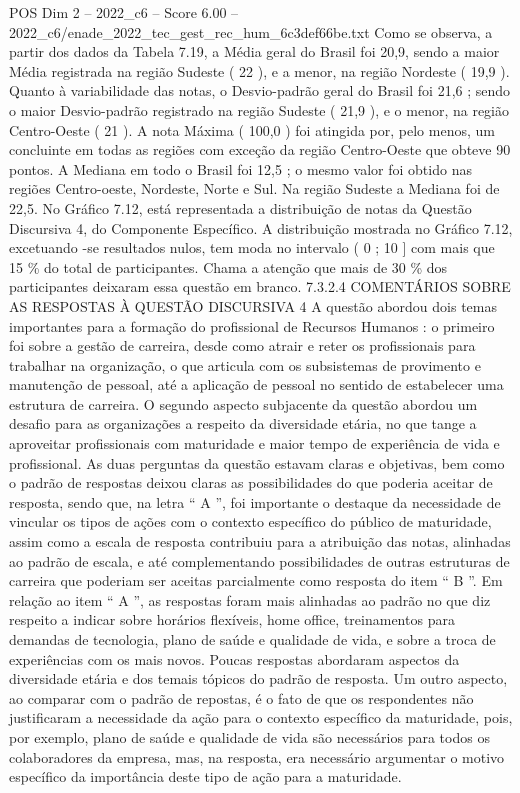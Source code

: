 \begin{textsample}{POS Dim 2 – 2022\_c6 – Score 6.00 – 2022\_c6/enade\_2022\_tec\_gest\_rec\_hum\_6c3def66be.txt}
Como se observa, a partir dos dados da Tabela 7.19, a Média geral do Brasil foi 20,9, sendo a maior Média registrada na região Sudeste ( 22 ), e a menor, na região Nordeste ( 19,9 ).
Quanto à variabilidade das notas, o Desvio-padrão geral do Brasil foi 21,6 ; sendo o maior Desvio-padrão registrado na região Sudeste ( 21,9 ), e o menor, na região Centro-Oeste ( 21 ).
A nota Máxima ( 100,0 ) foi atingida por, pelo menos, um concluinte em todas as regiões com exceção da região Centro-Oeste que obteve 90 pontos.
A Mediana em todo o Brasil foi 12,5 ; o mesmo valor foi obtido nas regiões Centro-oeste, Nordeste, Norte e Sul.
Na região Sudeste a Mediana foi de 22,5.
No Gráfico 7.12, está representada a distribuição de notas da Questão Discursiva 4, do Componente Específico.
A distribuição mostrada no Gráfico 7.12, excetuando -se resultados nulos, tem moda no intervalo ( 0 ; 10 ] com mais que 15 \% do total de participantes.
Chama a atenção que mais de 30 \% dos participantes deixaram essa questão em branco. 7.3.2.4 COMENTÁRIOS SOBRE AS RESPOSTAS À QUESTÃO DISCURSIVA 4 A questão abordou dois temas importantes para a formação do profissional de Recursos Humanos : o primeiro foi sobre a gestão de carreira, desde como atrair e reter os profissionais para trabalhar na organização, o que articula com os subsistemas de provimento e manutenção de pessoal, até a aplicação de pessoal no sentido de estabelecer uma estrutura de carreira.
O segundo aspecto subjacente da questão abordou um desafio para as organizações a respeito da diversidade etária, no que tange a aproveitar profissionais com maturidade e maior tempo de experiência de vida e profissional.
As duas perguntas da questão estavam claras e objetivas, bem como o padrão de respostas deixou claras as possibilidades do que poderia aceitar de resposta, sendo que, na letra “ A ”, foi importante o destaque da necessidade de vincular os tipos de ações com o contexto específico do público de maturidade, assim como a escala de resposta contribuiu para a atribuição das notas, alinhadas ao padrão de escala, e até complementando possibilidades de outras estruturas de carreira que poderiam ser aceitas parcialmente como resposta do item “ B ”.
Em relação ao item “ A ”, as respostas foram mais alinhadas ao padrão no que diz respeito a indicar sobre horários flexíveis, home office, treinamentos para demandas de tecnologia, plano de saúde e qualidade de vida, e sobre a troca de experiências com os mais novos.
Poucas respostas abordaram aspectos da diversidade etária e dos temais tópicos do padrão de resposta.
Um outro aspecto, ao comparar com o padrão de repostas, é o fato de que os respondentes não justificaram a necessidade da ação para o contexto específico da maturidade, pois, por exemplo, plano de saúde e qualidade de vida são necessários para todos os colaboradores da empresa, mas, na resposta, era necessário argumentar o motivo específico da importância deste tipo de ação para a maturidade.

\end{textsample}
